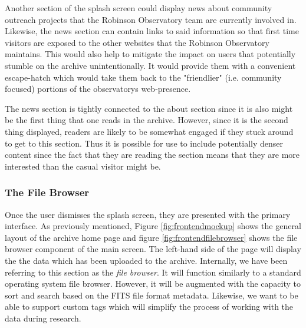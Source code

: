 \documentclass[12pt]{article}
\begin{document}
Another section of the splash screen could display news about community outreach projects that the Robinson Observatory team are currently involved in. Likewise, the news section can contain links to said information so that first time visitors are exposed to the other websites that the Robinson Observatory maintains. This would also help to mitigate the impact on users that potentially stumble on the archive unintentionally. It would provide them with a convenient escape-hatch which would take them back to the "friendlier" (i.e. community focused) portions of the observatorys web-presence.

The news section is tightly connected to the about section since it is also might be the first thing that one reads in the archive. However, since it is the second thing displayed, readers are likely to be somewhat engaged if they stuck around to get to this section. Thus it is possible for use to include potentially denser content since the fact that they are reading the section means that they are more interested than the casual visitor might be.

\subsubsection{The File Browser}

Once the user dismisses the splash screen, they are presented with the primary interface. As previously mentioned, Figure \ref{fig:frontendmockup} shows the general layout of the archive home page and figure \ref{fig:frontendfilebrowser} shows the file browser component of the main screen. The left-hand side of the page will display the the data which has been uploaded to the archive. Internally, we have been referring to this section as the \textit{file browser}. It will function similarly to a standard operating system file browser. However, it will be augmented with the capacity to sort and search based on the FITS file format metadata. Likewise, we want to be able to support custom tags which will simplify the process of working with the data during research.
\end{document}
